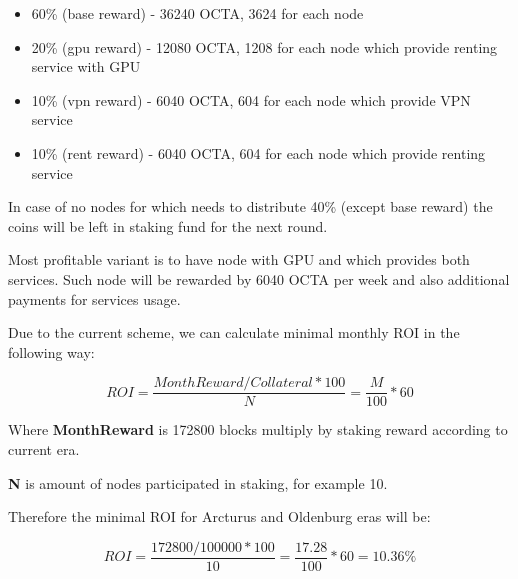 \begin{itemize}
    \item 60\% (base reward) - 36240 OCTA, 3624 for each node
    \item 20\% (gpu reward) - 12080 OCTA, 1208 for each node which provide renting service with GPU
    \item 10\% (vpn reward) - 6040 OCTA, 604 for each node which provide VPN service
    \item 10\% (rent reward) - 6040 OCTA, 604 for each node which provide renting service
\end{itemize}

In case of no nodes for which needs to distribute 40\% (except base reward) the coins will be left in staking fund for the next round.

Most profitable variant is to have node with GPU and which provides both services.
Such node will be rewarded by 6040 OCTA per week and also additional payments for services usage.

Due to the current scheme, we can calculate minimal monthly ROI in the following way:

\[
    ROI = \frac{MonthReward / Collateral * 100}{N} = \frac{M}{100} * 60
\]

Where \textbf{MonthReward} is 172800 blocks multiply by staking reward according to current era.

\textbf{N} is amount of nodes participated in staking, for example 10.

Therefore the minimal ROI for Arcturus and Oldenburg eras will be:

\[
    ROI = \frac{172800 / 100000 * 100}{10} = \frac{17.28}{100} * 60 = 10.36\%
\]
